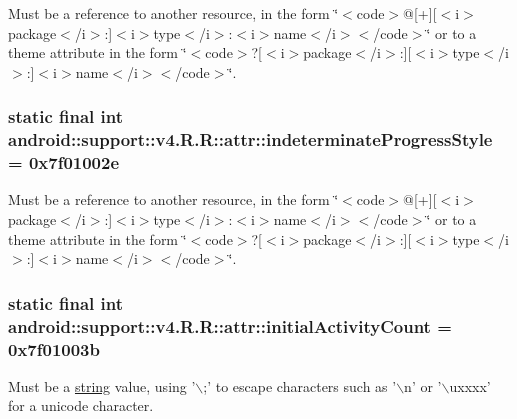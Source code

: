 Must be a reference to another resource, in the form \char`\"{}$<$code$>$@\mbox{[}+\mbox{]}\mbox{[}$<$i$>$package$<$/i$>$:\mbox{]}$<$i$>$type$<$/i$>$:$<$i$>$name$<$/i$>$$<$/code$>$\char`\"{} or to a theme attribute in the form \char`\"{}$<$code$>$?\mbox{[}$<$i$>$package$<$/i$>$:\mbox{]}\mbox{[}$<$i$>$type$<$/i$>$:\mbox{]}$<$i$>$name$<$/i$>$$<$/code$>$\char`\"{}. \hypertarget{classandroid_1_1support_1_1v4_1_1_r_1_1attr_dc6711d05312e6f9c0eb2d8b103ec6a3}{
\subsubsection[{indeterminateProgressStyle}]{\setlength{\rightskip}{0pt plus 5cm}static final int android::support::v4.R.R::attr::indeterminateProgressStyle = 0x7f01002e}}
\label{classandroid_1_1support_1_1v4_1_1_r_1_1attr_dc6711d05312e6f9c0eb2d8b103ec6a3}


Must be a reference to another resource, in the form \char`\"{}$<$code$>$@\mbox{[}+\mbox{]}\mbox{[}$<$i$>$package$<$/i$>$:\mbox{]}$<$i$>$type$<$/i$>$:$<$i$>$name$<$/i$>$$<$/code$>$\char`\"{} or to a theme attribute in the form \char`\"{}$<$code$>$?\mbox{[}$<$i$>$package$<$/i$>$:\mbox{]}\mbox{[}$<$i$>$type$<$/i$>$:\mbox{]}$<$i$>$name$<$/i$>$$<$/code$>$\char`\"{}. \hypertarget{classandroid_1_1support_1_1v4_1_1_r_1_1attr_c055d8953fd09aed9237fb1006d58c7b}{
\subsubsection[{initialActivityCount}]{\setlength{\rightskip}{0pt plus 5cm}static final int android::support::v4.R.R::attr::initialActivityCount = 0x7f01003b}}
\label{classandroid_1_1support_1_1v4_1_1_r_1_1attr_c055d8953fd09aed9237fb1006d58c7b}


Must be a \hyperlink{classandroid_1_1support_1_1v4_1_1_r_1_1string}{string} value, using '$\backslash$;' to escape characters such as '$\backslash$n' or '$\backslash$uxxxx' for a unicode character. 


